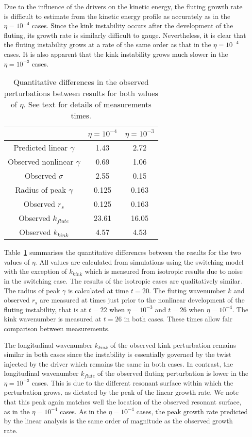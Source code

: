 Due to the influence of the drivers on the kinetic energy, the fluting growth rate is difficult to estimate from the kinetic energy profile as accurately as in the $\eta=10^{-4}$ cases. Since the kink instability occurs after the development of the fluting, its growth rate is similarly difficult to gauge. Nevertheless, it is clear that the fluting instability grows at a rate of the same order as that in the $\eta=10^{-4}$ cases. It is also apparent that the kink instability grows much slower in the $\eta=10^{-3}$ cases.

\begin{table}[]
\centering
\begin{tabular}{ccc}
&
$\eta=10^{-4}$ &
$\eta=10^{-3}$ \\
\midrule
Predicted linear $\gamma$ & 1.43 & 2.72  \\
Observed nonlinear $\gamma$ & 0.69 & 1.06  \\
Observed $\sigma$ & 2.55 & 0.15\\
\midrule
Radius of peak $\gamma$ & 0.125 & 0.163 \\
Observed $r_s$ & 0.125 & 0.163 \\
\midrule
Observed $k_{flute}$ & 23.61 & 16.05 \\
Observed $k_{kink}$ & 4.57 & 4.53 \\
\end{tabular}
\caption{Quantitative differences in the observed perturbations between results for both values of $\eta$. See text for details of measurements times.}
\label{tab:kink_fluting_params}
\end{table}

Table~\ref{tab:kink_fluting_params} summarises the quantitative differences between the results for the two values of $\eta$. All values are calculated from simulations using the switching model with the exception of $k_{kink}$ which is measured from isotropic results due to noise in the switching case. The results of the isotropic cases are qualitatively similar. The radius of peak $\gamma$ is calculated at time $t=20$. The fluting wavenumber $k$ and observed $r_s$ are measured at times just prior to the nonlinear development of the fluting instability, that is at $t=22$ when $\eta=10^{-3}$ and $t=26$ when $\eta = 10^{-4}$. The kink wavenumber is measured at $t=26$ in both cases. These times allow fair comparison between measurements.

The longitudinal wavenumber $k_{kink}$ of the observed kink perturbation remains similar in both cases since the instability is essentially governed by the twist injected by the driver which remains the same in both cases. In contrast, the longitudinal wavenumber $k_{flute}$ of the observed fluting perturbation is lower in the $\eta=10^{-3}$ cases. This is due to the different resonant surface within which the perturbation grows, as dictated by the peak of the linear growth rate. We note that this peak again matches well the location of the observed resonant surface, as in the $\eta=10^{-4}$ cases. As in the $\eta=10^{-4}$ cases, the peak growth rate predicted by the linear analysis is the same order of magnitude as the observed growth rate.

